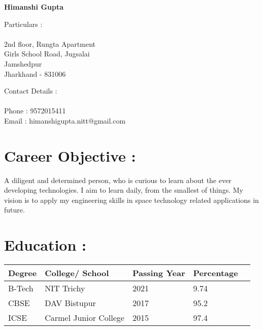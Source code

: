 \documentclass[10pt]{article} %
\begin{document}
\begin{center}
\huge
\textbf{Himanshi Gupta}
\end{center}
\noindent\makebox[\linewidth]{\rule{\paperwidth}{0.4pt}}

\begin{multicols}{2}
\large
Particulars :
\\
\\
\normalsize
2nd floor, Rungta Apartment
\\
Girls School Road, Jugsalai
\\
Jamshedpur
\\
Jharkhand - 831006
\columnbreak
\qquad
\qquad
\qquad
\qquad
\qquad
\qquad
\qquad

\large
Contact Details :
\\
\\
\normalsize
Phone : 9572015411
\\
Email : himanshigupta.nitt@gmail.com



\end{multicols}

\section* {Career Objective :}
A diligent and determined person, who is curious to learn about the ever developing technologies. I aim to learn daily, from the smallest of things. My vision is to apply my engineering skills in space technology related applications in future.



\section*{ Education :}

\begin{tabular}
{|l|l|l|l|l|||} 
\hline
\large \strut
Degree &\large \strut College/ School & \large \strut Passing Year &\large \strut Percentage \\ [10pt]
 \hline
B-Tech & NIT Trichy & 2021 & 9.74 \\[10pt]
\hline
 CBSE & DAV Bistupur & 2017 & 95.2 \\ [10pt]
\hline
 ICSE & Carmel Junior College & 2015 & 97.4 \\[10pt]
\hline  \end{tabular}
\end{document}
